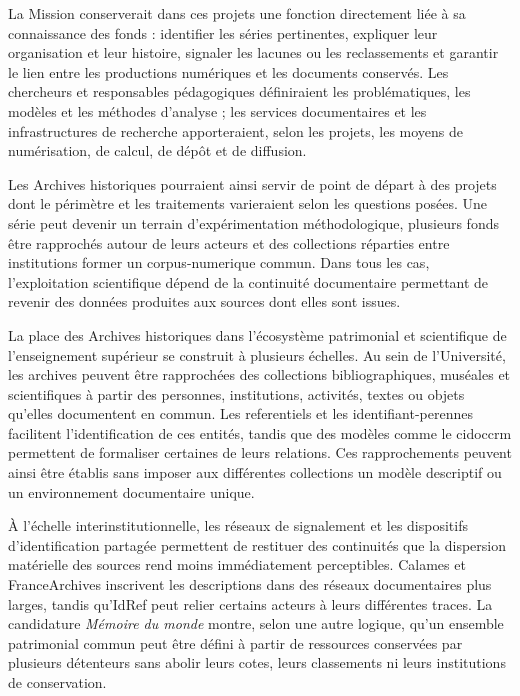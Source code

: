 La Mission conserverait dans ces projets une fonction directement liée à sa connaissance des fonds : identifier les séries pertinentes, expliquer leur organisation et leur histoire, signaler les lacunes ou les reclassements et garantir le lien entre les productions numériques et les documents conservés. Les chercheurs et responsables pédagogiques définiraient les problématiques, les modèles et les méthodes d'analyse ; les services documentaires et les infrastructures de recherche apporteraient, selon les projets, les moyens de numérisation, de calcul, de dépôt et de diffusion.

Les Archives historiques pourraient ainsi servir de point de départ à des projets dont le périmètre et les traitements varieraient selon les questions posées. Une série peut devenir un terrain d'expérimentation méthodologique, plusieurs fonds être rapprochés autour de leurs acteurs et des collections réparties entre institutions former un \gls{corpus-numerique} commun. Dans tous les cas, l'exploitation scientifique dépend de la continuité documentaire permettant de revenir des données produites aux sources dont elles sont issues.



La place des Archives historiques dans l'écosystème patrimonial et scientifique de l'enseignement supérieur se construit à plusieurs échelles. Au sein de l'Université, les archives peuvent être rapprochées des collections bibliographiques, muséales et scientifiques à partir des personnes, institutions, activités, textes ou objets qu'elles documentent en commun. Les \glspl{referentiel} et les \glspl{identifiant-perenne} facilitent l'identification de ces entités, tandis que des modèles comme le \gls{cidoccrm} permettent de formaliser certaines de leurs relations. Ces rapprochements peuvent ainsi être établis sans imposer aux différentes collections un modèle descriptif ou un environnement documentaire unique.

À l'échelle interinstitutionnelle, les réseaux de \gls{signalement} et les dispositifs d'identification partagée permettent de restituer des continuités que la dispersion matérielle des sources rend moins immédiatement perceptibles. Calames et FranceArchives inscrivent les descriptions dans des réseaux documentaires plus larges, tandis qu'IdRef peut relier certains acteurs à leurs différentes traces. La candidature \emph{Mémoire du monde} montre, selon une autre logique, qu'un ensemble patrimonial commun peut être défini à partir de ressources conservées par plusieurs détenteurs sans abolir leurs cotes, leurs classements ni leurs institutions de conservation.

